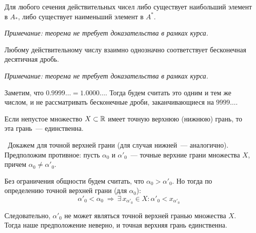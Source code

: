 \begin{theorem}
Для любого сечения действительных чисел либо существует наибольший элемент в \(A_{*}\),
либо существует наименьший элемент в \(A^{*}\).

\vspace{2mm}

\textit{Примечание: теорема не требует доказательства в рамках курса.}
\end{theorem}

\begin{theorem}
Любому действительному числу взаимно однозначно соответствует бесконечная десятичная дробь.

\vspace{2mm}

\textit{Примечание: теорема не требует доказательства в рамках курса.}
\end{theorem}

\begin{note}
Заметим, что \(0.9999\ldots=1.0000\ldots\). Тогда будем считать это одним и тем же числом,
и не рассматривать бесконечные дроби, заканчивающиеся на \(9999\ldots\).
\end{note}


\begin{theorem}
Если непустое множество \(X\subset\mathbb{R}\) имеет точную верхнюю (нижнюю) грань, то эта грань~--- единственна.

\vspace{2mm}

\proofname~Докажем для точной верхней грани (для случая нижней~--- аналогично).\\
Предположим противное: пусть \(\alpha_{0}\) и \(\alpha'_{0}\)~---
точные верхние грани множества \(X\), причем \(\alpha_{0}\neq\alpha'_{0}\).

Без ограничения общности будем считать, что \(\alpha_{0}>\alpha'_{0}\).
Но тогда по определению точной верхней грани (для \(\alpha_{0}\)):
\[
\alpha'_{0} < \alpha_{0} ~ \Rightarrow ~ \exists\,x_{\alpha'_{0}}\in X:
\alpha'_{0} < x_{\alpha'_{0}}
\]

Следовательно, \(\alpha'_{0}\) не может являться точной верхней гранью множества \(X\).
Тогда наше предположение неверно, и точная верхняя грань единственна.~\qedsymbol
\end{theorem}

